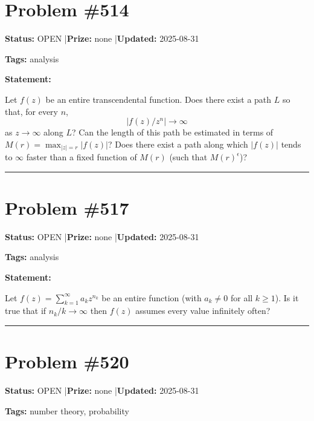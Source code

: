 \documentclass{article}
\begin{document}
\section{Problem \#514}
\label{prob:514}

\noindent\textbf{Status:} OPEN \quad|\quad \textbf{Prize:} none \quad|\quad \textbf{Updated:} 2025-08-31

\noindent\textbf{Tags:} analysis

\medskip

\noindent\textbf{Statement:}

Let $f(z)$ be an entire transcendental function. Does there exist a path $L$ so that, for every $n$,\[\lvert f(z)/z^n\rvert \to \infty\]as $z\to \infty$ along $L$? Can the length of this path be estimated in terms of $M(r)=\max_{\lvert z\rvert=r}\lvert f(z)\rvert$? Does there exist a path along which $\lvert f(z)\rvert$ tends to $\infty$ faster than a fixed function of $M(r)$ (such that $M(r)^\epsilon$)?

\noindent\rule{\linewidth}{0.4pt}


\section{Problem \#517}
\label{prob:517}

\noindent\textbf{Status:} OPEN \quad|\quad \textbf{Prize:} none \quad|\quad \textbf{Updated:} 2025-08-31

\noindent\textbf{Tags:} analysis

\medskip

\noindent\textbf{Statement:}

Let $f(z)=\sum_{k=1}^\infty a_kz^{n_k}$ be an entire function (with $a_k\neq 0$ for all $k\geq 1$). Is it true that if $n_k/k\to \infty$ then $f(z)$ assumes every value infinitely often?

\noindent\rule{\linewidth}{0.4pt}


\section{Problem \#520}
\label{prob:520}

\noindent\textbf{Status:} OPEN \quad|\quad \textbf{Prize:} none \quad|\quad \textbf{Updated:} 2025-08-31

\noindent\textbf{Tags:} number theory, probability
\end{document}
